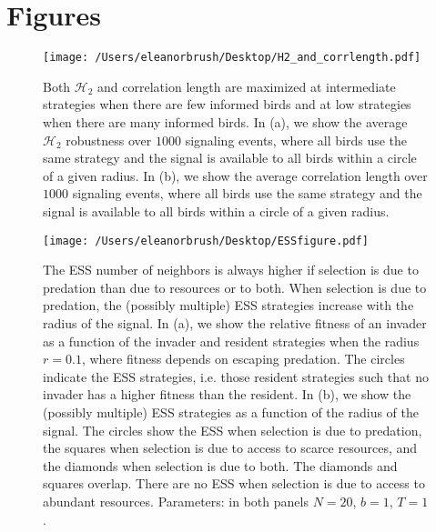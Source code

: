 \documentclass{article}
\begin{document}
\newpage
\section{Figures }
\begin{figure}[ht]
\texttt{[image: /Users/eleanorbrush/Desktop/H2\_and\_corrlength.pdf]}
\caption{\label{compare_props}  Both $\mathscr{H}_2$ and correlation length are maximized at intermediate strategies when there are few informed birds and at low strategies when there are many informed birds. In (a), we show the average $\mathscr{H}_2$ robustness over $1000$ signaling events, where all birds use the same strategy and the signal is available to all birds within a circle of a given radius.  In (b), we show the average correlation length over $1000$ signaling events, where all birds use the same strategy and the signal is available to all birds within a circle of a given radius. }
\end{figure}

\begin{figure}[ht]
\texttt{[image: /Users/eleanorbrush/Desktop/ESSfigure.pdf]}
\caption{\label{ESS} The ESS number of neighbors is always higher if selection is due to predation than due to resources or to both. When selection is due to predation, the (possibly multiple) ESS strategies increase with the radius of the signal. In (a), we show the relative fitness of an invader as a function of the invader and resident strategies when the radius $r=0.1$, where fitness depends on escaping predation. The circles indicate the ESS strategies, i.e. those resident strategies such that no invader has a higher fitness than the resident. In (b), we show the (possibly multiple) ESS strategies as a function of the radius of the signal. The circles show the ESS when selection is due to predation, the squares when selection is due to access to scarce resources, and the diamonds when selection is due to both. The diamonds and squares overlap. There are no ESS when selection is due to access to abundant resources.  Parameters:  in both panels $N=20$, $b=1$, $T=1$. 
}
\end{figure}
\end{document}
